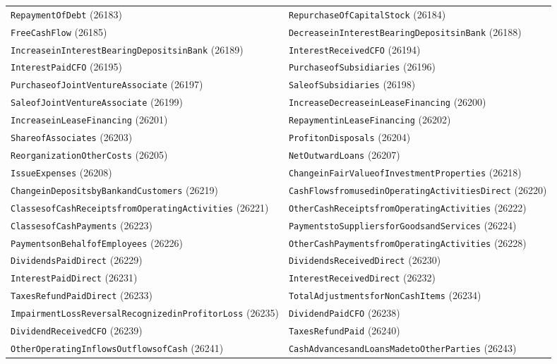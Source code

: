\documentclass[11pt,a4paper]{report}
\begin{document}
\begin{subappendices}
{\begin{longtable}{@{}p{}p{}@{}}
\texttt{RepaymentOfDebt} (26183) & \texttt{RepurchaseOfCapitalStock} (26184) \\
\texttt{FreeCashFlow} (26185) & \texttt{DecreaseinInterestBearingDepositsinBank} (26188) \\
\texttt{IncreaseinInterestBearingDepositsinBank} (26189) & \texttt{InterestReceivedCFO} (26194) \\
\texttt{InterestPaidCFO} (26195) & \texttt{PurchaseofSubsidiaries} (26196) \\
\texttt{PurchaseofJointVentureAssociate} (26197) & \texttt{SaleofSubsidiaries} (26198) \\
\texttt{SaleofJointVentureAssociate} (26199) & \texttt{IncreaseDecreaseinLeaseFinancing} (26200) \\
\texttt{IncreaseinLeaseFinancing} (26201) & \texttt{RepaymentinLeaseFinancing} (26202) \\
\texttt{ShareofAssociates} (26203) & \texttt{ProfitonDisposals} (26204) \\
\texttt{ReorganizationOtherCosts} (26205) & \texttt{NetOutwardLoans} (26207) \\
\texttt{IssueExpenses} (26208) & \texttt{ChangeinFairValueofInvestmentProperties} (26218) \\
\texttt{ChangeinDepositsbyBankandCustomers} (26219) & \texttt{CashFlowsfromusedinOperatingActivitiesDirect} (26220) \\
\texttt{ClassesofCashReceiptsfromOperatingActivities} (26221) & \texttt{OtherCashReceiptsfromOperatingActivities} (26222) \\
\texttt{ClassesofCashPayments} (26223) & \texttt{PaymentstoSuppliersforGoodsandServices} (26224) \\
\texttt{PaymentsonBehalfofEmployees} (26226) & \texttt{OtherCashPaymentsfromOperatingActivities} (26228) \\
\texttt{DividendsPaidDirect} (26229) & \texttt{DividendsReceivedDirect} (26230) \\
\texttt{InterestPaidDirect} (26231) & \texttt{InterestReceivedDirect} (26232) \\
\texttt{TaxesRefundPaidDirect} (26233) & \texttt{TotalAdjustmentsforNonCashItems} (26234) \\
\texttt{ImpairmentLossReversalRecognizedinProfitorLoss} (26235) & \texttt{DividendPaidCFO} (26238) \\
\texttt{DividendReceivedCFO} (26239) & \texttt{TaxesRefundPaid} (26240) \\
\texttt{OtherOperatingInflowsOutflowsofCash} (26241) & \texttt{CashAdvancesandLoansMadetoOtherParties} (26243) \\

\end{longtable}}
\end{subappendices}
\end{document}

